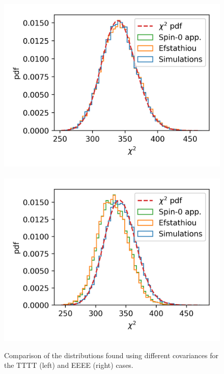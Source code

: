 \documentclass[useAMS,usenatbib]{mn2e}
\begin{document}
\begin{figure} %
  \centering
  \includegraphics[width=\columnwidth]{./figures/run_sph_ALL_TTTT_chi2.png}~
  \includegraphics[width=\columnwidth]{./figures/run_sph_ALL_EEEE_chi2.png}
  \caption{Comparison of the distributions found using different
    covariances for the TTTT (left) and EEEE (right) cases.}
  \label{fig:TTTT_EEEE_chi2}
\end{figure}
\end{document}
